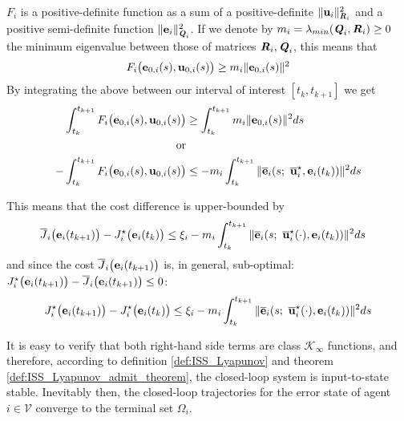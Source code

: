 \begin{gg_box}
  $F_i$ is a positive-definite function as a sum of a positive-definite
  $\|\bm{\mathbf{u}}_i\|^2_{\bm{\mathit{R}}_i}$ and a positive semi-definite function
  $\|\bm{\mathbf{e}}_i\|^2_{\bm{\mathit{Q}}_i}$. If we denote by
  $m_i = \lambda_{min}(\bm{\mathit{Q}}_i, \bm{\mathit{R}}_i) \geq 0$ the minimum eigenvalue
  between those of matrices $\bm{\mathit{R}}_i, \bm{\mathit{Q}}_i$, this means that
  \begin{align}
    F_i \big(\bm{\mathbf{e}}_{0,i}(s), \bm{\mathbf{u}}_{0,i} (s)\big) \geq m_i \|\bm{\mathbf{e}}_{0,i}(s)\|^2
  \end{align}
  By integrating the above between our interval of interest $[t_k, t_{k+1}]$ we get
  \begin{align}
    \int_{t_k}^{t_{k+1}} F_i \big(\vect{e}_{0,i}(s), \vect{u}_{0,i} (s)\big) &\geq \int_{t_k}^{t_{k+1}} m_i \|\vect{e}_{0,i}(s)\|^2 ds \\
    \text{or}\\
    -\int_{t_k}^{t_{k+1}} F_i \big(\vect{e}_{0,i}(s), \vect{u}_{0,i} (s)\big)
    &\leq -m_i \int_{t_k}^{t_{k+1}} \| \overline{\vect{e}}_i(s;\ \overline{\vect{u}}_i^{\star}, \vect{e}_i(t_k)) \|^2 ds
  \end{align}
\end{gg_box}
This means that the cost difference is upper-bounded by
\begin{align}
  \overline{J}_i\big(\bm{\mathbf{e}}_i(t_{k+1})\big) - J_i^{\star}\big(\bm{\mathbf{e}}_i(t_k)\big)
    &\leq \xi_i-m_i \int_{t_k}^{t_{k+1}} \| \overline{\bm{\mathbf{e}}}_i(s;\ \overline{\bm{\mathbf{u}}}_i^{\star}(\cdot), \bm{\mathbf{e}}_i(t_k)) \|^2 ds
\end{align}
and since the cost $\overline{J}_i\big(\bm{\mathbf{e}}_i(t_{k+1})\big)$ is, in general,
sub-optimal: $J_i^{\star}\big(\bm{\mathbf{e}}_i(t_{k+1})\big) - \overline{J}_i\big(\bm{\mathbf{e}}_i(t_{k+1})\big) \leq 0$:
\begin{align}
 J_i^{\star}\big(\vect{e}_i(t_{k+1})\big) - J_i^{\star}\big(\vect{e}_i(t_k)\big)
   \leq \xi_i-m_i \int_{t_k}^{t_{k+1}} \| \overline{\vect{e}}_i(s;\ \overline{\vect{u}}_i^{\star}(\cdot), \vect{e}_i(t_k)) \|^2 ds
 \label{eq:J_opt_between_consecutive_k_2}
\end{align}

It is easy to verify that both right-hand side terms are class
$\mathcal{K}_{\infty}$ functions, and therefore, according to definition
\eqref{def:ISS_Lyapunov} and theorem \eqref{def:ISS_Lyapunov_admit_theorem},
the closed-loop system is input-to-state stable. Inevitably then, the
closed-loop trajectories for the error state of agent $i \in \mathcal{V}$
converge to the terminal set $\Omega_i$.

